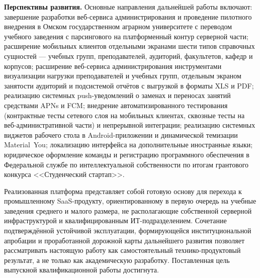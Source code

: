 \textbf{Перспективы развития.} Основные направления дальнейшей работы включают: завершение разработки веб-сервиса администрирования и проведение пилотного внедрения в Омском государственном аграрном университете с переводом учебного заведения с парсингового на платформенный контур серверной части; расширение мобильных клиентов отдельными экранами шести типов справочных сущностей --- учебных групп, преподавателей, аудиторий, факультетов, кафедр и корпусов; расширение веб-сервиса администрирования инструментами визуализации нагрузки преподавателей и учебных групп, отдельным экраном занятости аудиторий и подсистемой отчётов с выгрузкой в форматы XLS и PDF; реализацию системных push-уведомлений о заменах и переносах занятий средствами APNs и FCM; внедрение автоматизированного тестирования (контрактные тесты сетевого слоя на мобильных клиентах, сквозные тесты на веб-административной части) и непрерывной интеграции; реализацию системных виджетов рабочего стола в Android-приложении и динамической темизации Material~You; локализацию интерфейса на дополнительные иностранные языки; юридическое оформление команды и регистрацию программного обеспечения в Федеральной службе по интеллектуальной собственности по итогам грантового конкурса <<Студенческий стартап>>.

Реализованная платформа представляет собой готовую основу для перехода к промышленному SaaS-продукту, ориентированному в первую очередь на учебные заведения среднего и малого размера, не располагающие собственной серверной инфраструктурой и квалифицированным ИТ-подразделением. Сочетание подтверждённой устойчивой эксплуатации, формирующейся институциональной апробации и проработанной дорожной карты дальнейшего развития позволяет рассматривать настоящую работу как самостоятельный технико-продуктовый результат, а не только как академическую разработку. Поставленная цель выпускной квалификационной работы достигнута.
